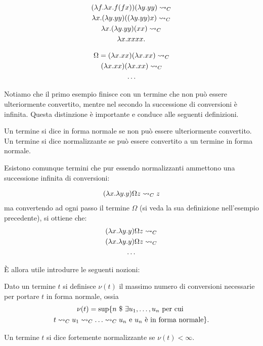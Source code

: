 \documentclass[]{marticle}
\begin{document}
\begin{block}[Esempio]
    \begin{gather*}
        (\lambda f . \lambda x . f(fx))(\lambda y. yy) \rightsquigarrow_C  \\
        \lambda x. (\lambda y. yy)((\lambda y.yy) x) \rightsquigarrow_C \\
        \lambda x .(\lambda y. yy)(xx) \rightsquigarrow_C \\
        \lambda x. xxxx.
    \end{gather*}
\end{block}

\begin{block}[Esempio]
    \begin{gather*}
        \Omega = (\lambda x.xx)(\lambda x.xx) \rightsquigarrow_C \\ 
        (\lambda x.xx)(\lambda x.xx) \rightsquigarrow_C \\
        \dots
    \end{gather*}
\end{block}

Notiamo che il primo esempio finisce con un termine che non pu\`o essere
ulteriormente convertito, mentre nel secondo la successione di conversioni \`e
infinita. Questa distinzione \`e importante e conduce alle seguenti definizioni.

\begin{block}[Definizione]
    Un termine si dice in forma normale se non pu\`o essere ulteriormente
    convertito. Un termine si dice normalizzante se pu\`o essere convertito a un
    termine in forma normale.
\end{block}

Esistono comunque termini che pur essendo normalizzanti ammettono una
successione infinita di conversioni:

\begin{block}[Esempio]
    \begin{gather*}
        (\lambda x . \lambda y. y)\Omega z \rightsquigarrow_C z
    \end{gather*}
    ma convertendo ad ogni passo il termine $\Omega$ (si veda la sua definizione
    nell'esempio precedente), si ottiene che:
    \begin{gather*}
        (\lambda x . \lambda y. y)\Omega z \rightsquigarrow_C \\ 
        (\lambda x . \lambda y. y)\Omega z \rightsquigarrow_C \\
        \dots
    \end{gather*}
\end{block}

\`E allora utile introdurre le seguenti nozioni:
\begin{block}[Definizione]
    Dato un termine $t$ si definisce $\nu(t)$ il massimo numero di conversioni
    necessarie per portare $t$ in forma normale, ossia
    \begin{gather*}
        \nu (t) = \sup \setof { n \st
            \exists u_1, \dots, u_n \text{ per cui } \\
            t \conv_C u_1 \conv_C \dots
            \conv_C u_n \text{ e $u_n$ \`e in forma normale}
        }.
    \end{gather*}

    Un termine $t$ si dice fortemente normalizzante se $\nu(t) < \infty$.
\end{block}
\end{document}
